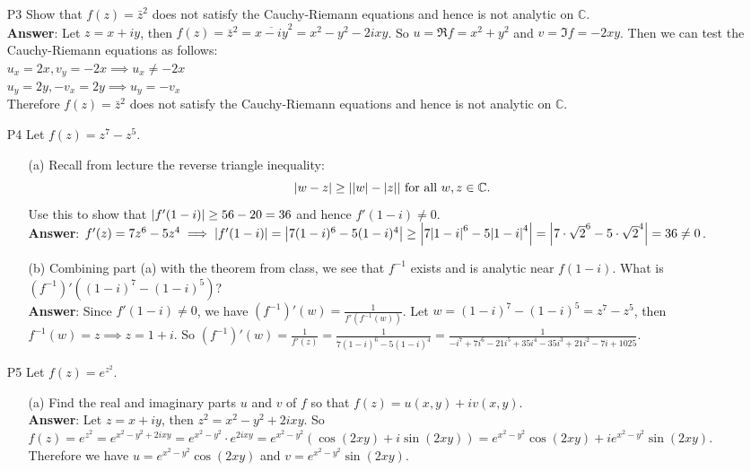 \documentclass{article}
\begin{document}
\begin{itemize}
      \item [P3] Show that $f(z)=\bar{z}^2$ does not satisfy the Cauchy-Riemann equations and hence is not analytic on $\mathbb{C}$.\\
            \textbf{Answer}: Let $z=x+iy$, then $f(z)=\bar{z}^2=\overline{x-iy}^2=x^2-y^2-2ixy$. So $u=\Re f=x^2+y^2$ and $v=\Im f=-2xy$. Then we can test the Cauchy-Riemann equations as follows:\\
            $u_x=2x,v_y=-2x\implies u_x\neq -2x$\\
            $u_y=2y,-v_x=2y\implies u_y=-v_x$\\
            Therefore $f(z)=\bar{z}^2$ does not satisfy the Cauchy-Riemann equations and hence is not analytic on $\mathbb{C}$.
      \item [P4] Let $f(z)=z^7-z^5$.
            \begin{itemize}
                  \item [(a)] Recall from lecture the reverse triangle inequality: \[\abs{w-z}\geq\abs{\abs{w}-\abs{z}}\text{ for all }w,z\in\mathbb{C}.\] Use this to show that $\abs{f'(1-i)}\geq 56-20=36$ and hence $f'(1-i)\neq 0$.\\
                        \textbf{Answer}: $f'(z)=7z^6-5z^4\implies\abs{f'(1-i)}=\abs{7(1-i)^6-5(1-i)^4}\geq\abs{7\abs{1-i}^6-5\abs{1-i}^4}=\abs{7\cdot\sqrt{2}^6-5\cdot\sqrt{2}^4}=36\neq 0$.
                  \item [(b)] Combining part (a) with the theorem from class, we see that $f^{-1}$ exists and is analytic near $f(1-i)$. What is $(f^{-1})'((1-i)^7-(1-i)^5)$?\\
                        \textbf{Answer}: Since $f'(1-i)\neq 0$, we have $(f^{-1})'(w)=\frac{1}{f'(f^{-1}(w))}$. Let $w=(1-i)^7-(1-i)^5=z^7-z^5$, then $f^{-1}(w)=z\implies z=1+i$. So $(f^{-1})'(w)=\frac{1}{f'(z)}=\frac{1}{7(1-i)^6-5(1-i)^4}=\frac{1}{-i^7+7i^6-21i^5+35i^4-35i^3+21i^2-7i+1025}$.
            \end{itemize}
      \item [P5] Let $f(z)=e^{z^2}$.
            \begin{itemize}
                  \item [(a)] Find the real and imaginary parts $u$ and $v$ of $f$ so that $f(z)=u(x,y)+iv(x,y)$.\\
                        \textbf{Answer}: Let $z=x+iy$, then $z^2=x^2-y^2+2ixy$. So $f(z)=e^{z^2}=e^{x^2-y^2+2ixy}=e^{x^2-y^2}\cdot e^{2ixy}=e^{x^2-y^2}(\cos(2xy)+i\sin(2xy))=e^{x^2-y^2}\cos(2xy)+ie^{x^2-y^2}\sin(2xy)$. Therefore we have $u=e^{x^2-y^2}\cos(2xy)$ and $v=e^{x^2-y^2}\sin(2xy)$.

\end{itemize}
\end{itemize}
\end{document}
